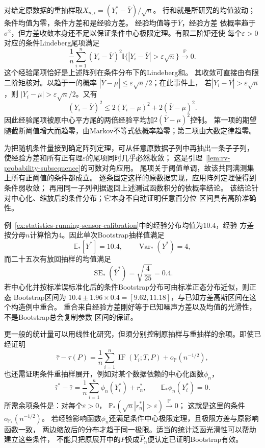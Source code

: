 对给定原数据的重抽样取\(X_{n,i}=(Y_i^\ast-\overline Y)/\sqrt n\)。
行和就是所研究的均值波动；条件均值为零，条件方差和是经验方差。
经验均值等于\(\overline Y\)，经验方差
依概率趋于\(\sigma^2\)，但方差收敛本身还不足以保证条件中心极限定理。有限二阶矩还使
每个\(\varepsilon>0\)对应的条件Lindeberg尾项满足
\[
  \frac1n\sum_{i=1}^n(Y_i-\overline Y)^2
  \mathbb I\{|Y_i-\overline Y|>\varepsilon\sqrt n\}
  \xrightarrow{\mathbb P}0.
\]
这个经验尾项恰好是上述阵列在条件分布下的Lindeberg和。
其收敛可直接由有限二阶矩核对。以趋于一的概率
\(|\overline Y-\mu|\leq\varepsilon\sqrt n/2\)；在此事件上，
若\(|Y_i-\overline Y|>\varepsilon\sqrt n\)，则
\(|Y_i-\mu|>\varepsilon\sqrt n/2\)。又有
\[
 (Y_i-\overline Y)^2\leq2(Y_i-\mu)^2+2(\overline Y-\mu)^2.
\]
因此经验尾项被原中心平方尾的两倍经验平均加\(2(\overline Y-\mu)^2\)控制。
第一项的期望随截断阈值增大而趋零，由Markov不等式依概率趋零；第二项由大数定律趋零。

为把随机条件量接到确定阵列定理，可从任意原数据子列中再抽出一条子子列，
使经验方差和所有正有理\(\varepsilon\)的尾项同时几乎必然收敛；
这是引理~\ref{lem:rv-probability-subsequence}的可数对角应用。
尾项关于阈值单调，故该共同满测集上所有正阈值的条件都成立。
逐条固定这样的原数据实现，应用阵列定理便得到条件弱收敛；
再用同一子列判据返回上述测试函数积分的依概率结论。
该结论针对中心化、缩放后的条件分布；它本身不自动证明任意百分位
区间具有高阶准确性。

例~\ref{ex:statistics-running-sensor-calibration}中的经验分布均值为\(10.4\)，经验
方差按分母\(n\)计算恰为\(4\)。因此单次Bootstrap抽样值满足
\[
  \mathbb{E}_\ast[Y^\ast]=10.4,\qquad
  \operatorname{Var}_\ast(Y^\ast)=4,
\]
而二十五次有放回抽样的均值满足
\[
  \operatorname{SE}_\ast(\overline Y^\ast)
  =
  \sqrt{\frac4{25}}=0.4.
\]
若中心化并按标准误标准化后的条件Bootstrap分布可由标准正态分布近似，则正态
Bootstrap区间为
\(10.4\pm1.96\times0.4=[9.62,11.18]\)，与已知方差高斯区间在这个构造例中重合。
重合来自经验方差刚好等于已知噪声方差以及均值的光滑性，不是Bootstrap总会复制参数
区间的保证。

更一般的统计量可以用线性化研究，但须分别控制原抽样与重抽样的余项。即使已经证明
\[
  \widehat\tau-\tau(P)
  =
  \frac1n\sum_{i=1}^n\operatorname{IF}(Y_i;T,P)
  +o_{\mathbb{P}}(n^{-1/2}),
\]
也还需证明条件重抽样展开，例如对某个数据依赖的中心化函数\(\phi_n\)，
\[
 \widehat\tau^\ast-\widehat\tau
 =\frac1n\sum_{i=1}^n\phi_n(Y_i^\ast)+r_n^\ast,\qquad
 \mathbb E_\ast\phi_n(Y_i^\ast)=0.
\]
所需余项条件是：对每个\(\varepsilon>0\)，
\(\mathbb P_\ast(\sqrt n|r_n^\ast|>\varepsilon)\xrightarrow{\mathbb P}0\)；
这就是这里的条件\(o_{\mathbb P_\ast}(n^{-1/2})\)。
若经验影响函数\(\phi_n\)还满足条件中心极限定理，且极限方差与原影响函数一致，
两边缩放后的分布才趋于同一极限。适当的统计泛函光滑性可以帮助建立这些条件，
不能只把原展开中的\(P\)换成\(\widehat P_n\)便认定已证明Bootstrap有效。

